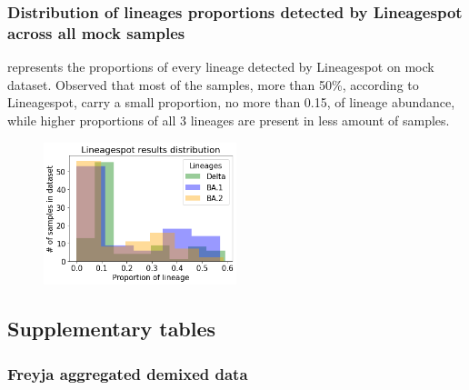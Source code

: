        \subsubsection{Distribution of lineages proportions detected by Lineagespot across all mock samples}  
         represents the proportions of every lineage detected by Lineagespot on mock dataset. Observed that most of the samples, more than 50\%, according to Lineagespot, carry a small proportion, no more than 0.15, of lineage abundance, while higher proportions of all 3 lineages are present in less amount of samples.
        \begin{figure}[ht!]
        	\centering
            \includegraphics[width=0.5\textwidth]{figures/further/distr-lineagespot.png}
            \label{fig:further:dist-ls}
        \end{figure}
    \subsection{Supplementary tables}
        \subsubsection{Freyja aggregated demixed data} \label{sec:appendix:tabs:freyja}

